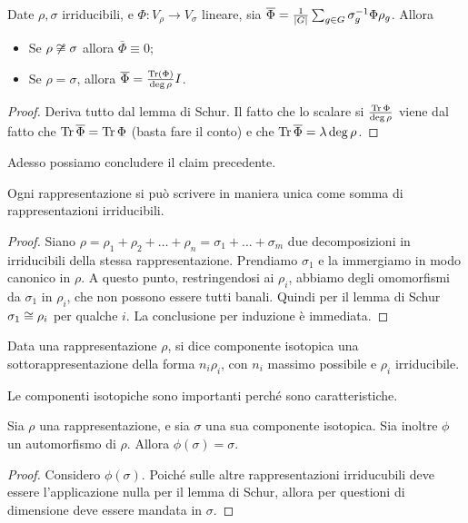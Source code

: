     \begin{mycor}
     Date $\rho,\sigma$ irriducibili, e $\Phi: V_\rho \rightarrow V_\sigma$ lineare, sia $\overline \Phi = \frac 1{\left|G\right|} \sum_{g\in G} \sigma_g^{-1} \Phi \rho_g$. Allora
     \begin{itemize}
      \item Se $\rho \not \cong \sigma$ allora $\bar \Phi\equiv 0$;
      \item Se $\rho = \sigma$, allora $\overline \Phi = \frac{\operatorname{Tr}(\Phi)}{\deg \rho}I$.
     \end{itemize}
    \end{mycor}
    \begin{proof}
     Deriva tutto dal lemma di Schur. Il fatto che lo scalare si $\frac{\operatorname{Tr} \Phi}{\deg \rho}$ viene dal fatto che $\operatorname{Tr} \overline \Phi = \operatorname{Tr} \Phi$ (basta fare il conto) e che $\operatorname{Tr} \overline \Phi = \lambda \deg \rho$.
    \end{proof}


    Adesso possiamo concludere il claim precedente.
    \begin{myprop}
     Ogni rappresentazione si può scrivere in maniera unica come somma di rappresentazioni irriducibili.
    \end{myprop}
    \begin{proof}
     Siano $\rho = \rho_1 + \rho_2 + \dots + \rho_n = \sigma_1 + \dots +\sigma_m$ due decomposizioni in irriducibili della stessa rappresentazione. Prendiamo $\sigma_1$ e la immergiamo in modo canonico in $\rho$. A questo punto, restringendosi ai $\rho_i$, abbiamo degli omomorfismi da $\sigma_1$ in $\rho_i$, che non possono essere tutti banali. Quindi per il lemma di Schur $\sigma_1\cong \rho_i$ per qualche $i$. La conclusione per induzione è immediata. 
    \end{proof}
    
    \begin{mydef}
     Data una rappresentazione $\rho$, si dice componente isotopica una sottorappresentazione della forma $n_i\rho_i$, con $n_i$ massimo possibile e $\rho_i$ irriducibile.
    \end{mydef}

    Le componenti isotopiche sono importanti perché sono caratteristiche.
    
    \begin{myprop}
     Sia $\rho$ una rappresentazione, e sia $\sigma$ una sua componente isotopica. Sia inoltre $\phi$ un automorfismo di $\rho$. Allora $\phi(\sigma)=\sigma$.
    \end{myprop}

    \begin{proof}
     Considero $\phi(\sigma)$. Poiché sulle altre rappresentazioni irriducubili deve essere l'applicazione nulla per il lemma di Schur, allora per questioni di dimensione deve essere mandata in $\sigma$.
    \end{proof}
  
